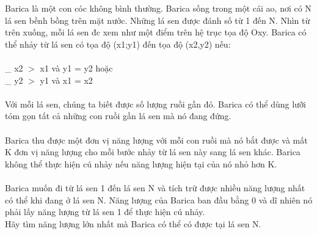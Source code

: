 Barica là một con cóc không bình thường. Barica sống trong một cái ao, nơi có N lá sen bềnh bồng trên mặt nước. Những lá sen được đánh số từ 1 đến N. Nhìn từ trên xuống, mỗi lá sen đc xem như một điểm trên hệ trục tọa độ Oxy. Barica có thể nhảy từ lá sen có tọa độ (x1;y1) đến tọa độ (x2,y2) nếu:   
\\
\\   \_ x2 $>$ x1 và y1 = y2 hoặc   
\\   \_ y2 $>$ y1 và x1 = x2   
\\
\\   Với mỗi  lá sen, chúng ta biết được số lượng ruồi gần đó. Barica có thể dùng lưỡi tóm gọn tất cả những con ruồi gần lá sen mà nó đang đứng.   
\\
\\   Barica thu được một đơn vị năng lượng với mỗi con ruồi mà nó bắt được và mất K đơn vị năng lượng cho mỗi bước nhảy từ lá sen này sang lá sen khác. Barica không thể thực hiện cú nhảy nếu năng lượng hiện tại của nó nhỏ hơn K.   
\\
\\   Barica muốn đi từ lá sen 1 đến lá sen N và tích trữ được nhiều năng lượng nhất có thể khi đang ở lá sen N. Năng lượng của Barica ban đầu bằng 0 và dĩ nhiên nó phải lấy năng lượng từ lá sen 1 để thực hiện cú nhảy.   
\\   Hãy tìm năng lượng lớn nhất mà Barica có thể có được tại lá sen N.  

\